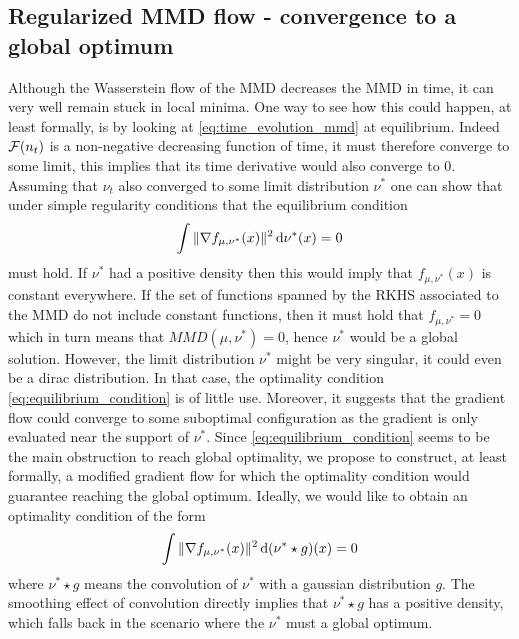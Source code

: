 \subsection{Regularized MMD flow - convergence to a global optimum}

Although the Wasserstein flow of the MMD decreases the MMD in time, it can very well remain stuck in local minima. One way to see how this could happen, at least formally, is by looking at \cref{eq:time_evolution_mmd} at equilibrium. Indeed ${{\mathcal F}}(n_t)$ is a non-negative decreasing function of time, it must therefore converge to some limit, this implies that its time derivative would also converge to $0$. Assuming that $\nu_t$ also converged to some limit distribution $\nu^{*}$ one can show that under simple regularity conditions that the equilibrium condition
\begin{align}\label{eq:equilibrium_condition}
\int \Vert \nabla f_{\mu,\nu^{*}}(x)\Vert^2 \mathop{}\!\mathrm{d} \nu^{*}(x) =0  
\end{align} 
must hold. If $\nu^*$ had a positive density then this would imply that $f_{\mu,\nu^{*}}(x)$ is constant everywhere. If the set of functions spanned by the RKHS associated to the MMD do not include constant functions, then it must hold that $f_{\mu,\nu^{*}}=0$ which in turn means that $MMD(\mu,\nu^{*})=0$, hence $\nu^*$ would be a global solution. However, the limit distribution $\nu^*$  might be very singular, it could even be a dirac distribution. In that case, the optimality condition \cref{eq:equilibrium_condition} is of little use. Moreover, it suggests that the gradient flow could converge to some suboptimal configuration as the gradient is only evaluated near the support of $\nu^*$.
Since \cref{eq:equilibrium_condition} seems to be the main obstruction to reach global optimality, we propose to construct, at least formally, a modified gradient flow for which the optimality condition would guarantee reaching the global optimum.
Ideally, we would like to obtain an optimality condition of the form
\begin{align}\label{eq:soothed_equilibrium_condition}
\int \Vert \nabla f_{\mu,\nu^{*}}(x)\Vert^2 \mathop{}\!\mathrm{d} (\nu^{*}\star g)(x) =0  
\end{align}
where $\nu^{*}\star g$ means the convolution of $\nu^*$ with a gaussian distribution $g$. The smoothing effect of convolution directly implies that $\nu^{*}\star g$ has a positive density, which falls back in the scenario where the $\nu^*$ must a global optimum.
